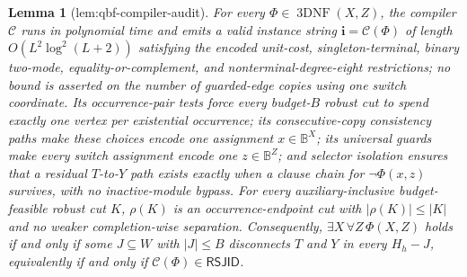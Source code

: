\documentclass{article}
\newtheorem{lemma}{Lemma}
\begin{document}
\begin{lemma}[lem:qbf-compiler-audit]\label{lem:qbf-compiler-audit}
For every \(\Phi\in\operatorname{3DNF}(X,Z)\), the compiler \(\mathcal C\) runs in polynomial time and emits a valid instance string \(\mathbf i=\mathcal C(\Phi)\) of length \(O(L^2\log^2(L+2))\) satisfying the encoded unit-cost, singleton-terminal, binary two-mode, equality-or-complement, and nonterminal-degree-eight restrictions; no bound is asserted on the number of guarded-edge copies using one switch coordinate. Its occurrence-pair tests force every budget-\(B\) robust cut to spend exactly one vertex per existential occurrence; its consecutive-copy consistency paths make these choices encode one assignment \(x\in\mathbb B^X\); its universal guards make every switch assignment encode one \(z\in\mathbb B^Z\); and selector isolation ensures that a residual \(T\)-to-\(Y\) path exists exactly when a clause chain for \(\neg\Phi(x,z)\) survives, with no inactive-module bypass. For every auxiliary-inclusive budget-feasible robust cut \(K\), \(\rho(K)\) is an occurrence-endpoint cut with \(|\rho(K)|\le |K|\) and no weaker completion-wise separation. Consequently, \(\exists X\,\forall Z\,\Phi(X,Z)\) holds if and only if some \(J\subseteq W\) with \(|J|\le B\) disconnects \(T\) and \(Y\) in every \(H_h-J\), equivalently if and only if \(\mathcal C(\Phi)\in\mathsf{RSJID}\).
\end{lemma}
\end{document}
